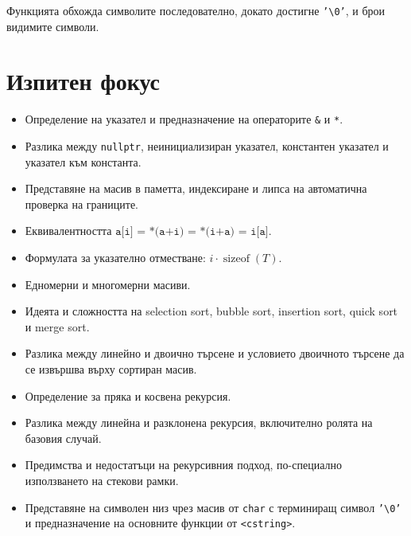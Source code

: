 Функцията обхожда символите последователно, докато достигне \texttt{'\textbackslash 0'}, и брои видимите символи.

\section{Изпитен фокус}\label{s:15.8}

\begin{itemize}
\item Определение на указател и предназначение на операторите \texttt{\&} и \texttt{*}.
\item Разлика между \texttt{nullptr}, неинициализиран указател, константен указател и указател към константа.
\item Представяне на масив в паметта, индексиране и липса на автоматична проверка на границите.
\item Еквивалентността $\texttt{a[i] = *(a+i) = *(i+a) = i[a]}$.
\item Формулата за указателно отместване: $i\cdot\operatorname{sizeof}(T)$.
\item Едномерни и многомерни масиви.
\item Идеята и сложността на selection sort, bubble sort, insertion sort, quick sort и merge sort.
\item Разлика между линейно и двоично търсене и условието двоичното търсене да се извършва върху сортиран масив.
\item Определение за пряка и косвена рекурсия.
\item Разлика между линейна и разклонена рекурсия, включително ролята на базовия случай.
\item Предимства и недостатъци на рекурсивния подход, по-специално използването на стекови рамки.
\item Представяне на символен низ чрез масив от \texttt{char} с терминиращ символ \texttt{'\textbackslash 0'} и предназначение на основните функции от \texttt{<cstring>}.
\end{itemize}
